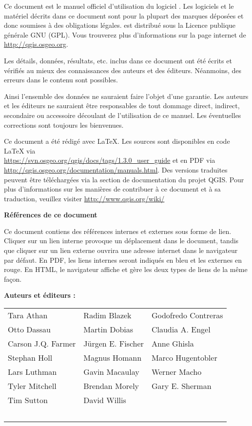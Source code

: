 \frontmatter
\pagestyle{scrplain}
\vspace{1cm}
Ce document est le manuel officiel d'utilisation du logiciel \QG. Les logiciels et le matériel décrits dans ce document sont pour la plupart des marques déposées et donc soumises à des obligations légales. \QG est distribué sous la Licence publique générale GNU (GPL). Vous trouverez plus d'informations sur la page internet de \QG \url{http://qgis.osgeo.org}.
\par\bigskip
Les détails, données, résultats, etc. inclus dans ce document ont été écrits et vérifiés au mieux des connaissances des auteurs et des éditeurs. Néanmoins, des erreurs dans le contenu sont possibles.
\par\bigskip
Ainsi l'ensemble des données ne sauraient faire l'objet d'une garantie. Les auteurs et les éditeurs ne sauraient être responsables de tout dommage direct, indirect, secondaire ou accessoire découlant de l'utilisation de ce manuel. Les éventuelles corrections sont toujours les bienvenues.
\par\bigskip
Ce document a été rédigé avec \LaTeX. Les sources sont disponibles en code \LaTeX{} via\\ \url{https://svn.osgeo.org/qgis/docs/tags/1.3.0_user_guide} et en PDF via \url{http://qgis.osgeo.org/documentation/manuals.html}. 
Des versions traduites peuvent être téléchargées via la section de documentation du projet QGIS. Pour plus d'informations sur les manières de contribuer à ce document et à sa traduction, veuillez visiter \url{http://www.qgis.org/wiki/} 

\vspace{1cm}
\noindent
\textbf{Références de ce document}
\par\bigskip
Ce document contiens des références internes et externes sous forme de lien. Cliquer sur un lien interne provoque un déplacement dans le document, tandis que cliquer sur un lien externe ouvrira une adresse internet dans le navigateur par défaut. En PDF, les liens internes seront indiqués en bleu et les externes en rouge. En HTML, le navigateur affiche et gère les deux types de liens de la même fa\c{c}on.

\newpage

\begin{flushleft}
\textbf{Auteurs et éditeurs :}
 \par\bigskip\noindent
\begin{tabular}{p{4cm} p{4cm} p{4cm}}
Tara Athan & Radim Blazek & Godofredo Contreras   \\
 Otto Dassau & Martin Dobias & Claudia A. Engel \\ 
 Carson J.Q. Farmer &J\"urgen E. Fischer & Anne Ghisla \\
Stephan Holl &  Magnus Homann& Marco Hugentobler \\ 
 Lars Luthman & Gavin Macaulay & Werner Macho \\
  Tyler Mitchell & Brendan Morely&Gary E. Sherman\\
  Tim Sutton & David Willis \\ \
\end{tabular}
\end{flushleft}

